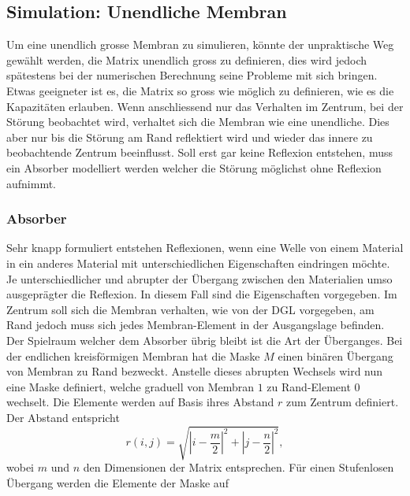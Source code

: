 \subsection{Simulation: Unendliche Membran}

Um eine unendlich grosse Membran zu simulieren, könnte der unpraktische Weg gewählt werden, die Matrix unendlich gross zu definieren, dies wird jedoch spätestens bei der numerischen Berechnung seine Probleme mit sich bringen.
Etwas geeigneter ist es, die Matrix so gross wie möglich zu definieren, wie es die Kapazitäten erlauben.
Wenn anschliessend nur das Verhalten im Zentrum, bei der Störung beobachtet wird, verhaltet sich die Membran wie eine unendliche. 
Dies aber nur bis die Störung am Rand reflektiert wird und wieder das innere zu beobachtende Zentrum beeinflusst.
Soll erst gar keine Reflexion entstehen, muss ein Absorber modelliert werden welcher die Störung möglichst ohne Reflexion aufnimmt.

\subsubsection{Absorber}
Sehr knapp formuliert entstehen Reflexionen, wenn eine Welle von einem Material in ein anderes Material mit unterschiedlichen Eigenschaften eindringen möchte.
Je unterschiedlicher und abrupter der Übergang zwischen den Materialien umso ausgeprägter die Reflexion.
In diesem Fall sind die Eigenschaften vorgegeben.
Im Zentrum soll sich die Membran verhalten, wie von der DGL vorgegeben, am Rand jedoch muss sich jedes Membran-Element in der Ausgangslage befinden. 
Der Spielraum welcher dem Absorber übrig bleibt ist die Art der Überganges.
Bei der endlichen kreisförmigen Membran hat die Maske $M$ einen binären Übergang von Membran zu Rand bezweckt.
Anstelle dieses abrupten Wechsels wird nun eine Maske definiert, welche graduell von Membran $1$ zu Rand-Element $0$ wechselt.
Die Elemente werden auf Basis ihres Abstand $r$ zum Zentrum definiert. 
Der Abstand entspricht 
\begin{equation*}
	r(i,j) = \sqrt{|i-\frac{m}{2}|^2+|j-\frac{n}{2}|^2},
\end{equation*} 
wobei $ m $ und $n$ den Dimensionen der Matrix entsprechen.
Für einen Stufenlosen Übergang werden die Elemente der Maske auf 

